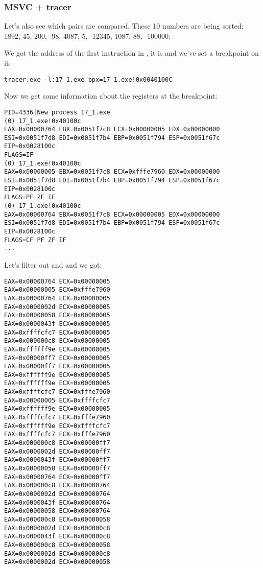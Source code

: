 

\subsubsection{MSVC + tracer}

Let's also see which pairs are compared.
These 10 numbers are being sorted: 
1892, 45, 200, -98, 4087, 5, -12345, 1087, 88, -100000.

We got the address of the first \CMP instruction in \comp, it is  and we've set a breakpoint on it:

\begin{lstlisting}
tracer.exe -l:17_1.exe bpx=17_1.exe!0x0040100C
\end{lstlisting}

Now we get some information about the registers at the breakpoint:

\begin{lstlisting}
PID=4336|New process 17_1.exe
(0) 17_1.exe!0x40100c
EAX=0x00000764 EBX=0x0051f7c8 ECX=0x00000005 EDX=0x00000000
ESI=0x0051f7d8 EDI=0x0051f7b4 EBP=0x0051f794 ESP=0x0051f67c
EIP=0x0028100c
FLAGS=IF
(0) 17_1.exe!0x40100c
EAX=0x00000005 EBX=0x0051f7c8 ECX=0xfffe7960 EDX=0x00000000
ESI=0x0051f7d8 EDI=0x0051f7b4 EBP=0x0051f794 ESP=0x0051f67c
EIP=0x0028100c
FLAGS=PF ZF IF
(0) 17_1.exe!0x40100c
EAX=0x00000764 EBX=0x0051f7c8 ECX=0x00000005 EDX=0x00000000
ESI=0x0051f7d8 EDI=0x0051f7b4 EBP=0x0051f794 ESP=0x0051f67c
EIP=0x0028100c
FLAGS=CF PF ZF IF
...
\end{lstlisting}

Let's filter out  and  and we got:

\begin{lstlisting}
EAX=0x00000764 ECX=0x00000005
EAX=0x00000005 ECX=0xfffe7960
EAX=0x00000764 ECX=0x00000005
EAX=0x0000002d ECX=0x00000005
EAX=0x00000058 ECX=0x00000005
EAX=0x0000043f ECX=0x00000005
EAX=0xffffcfc7 ECX=0x00000005
EAX=0x000000c8 ECX=0x00000005
EAX=0xffffff9e ECX=0x00000005
EAX=0x00000ff7 ECX=0x00000005
EAX=0x00000ff7 ECX=0x00000005
EAX=0xffffff9e ECX=0x00000005
EAX=0xffffff9e ECX=0x00000005
EAX=0xffffcfc7 ECX=0xfffe7960
EAX=0x00000005 ECX=0xffffcfc7
EAX=0xffffff9e ECX=0x00000005
EAX=0xffffcfc7 ECX=0xfffe7960
EAX=0xffffff9e ECX=0xffffcfc7
EAX=0xffffcfc7 ECX=0xfffe7960
EAX=0x000000c8 ECX=0x00000ff7
EAX=0x0000002d ECX=0x00000ff7
EAX=0x0000043f ECX=0x00000ff7
EAX=0x00000058 ECX=0x00000ff7
EAX=0x00000764 ECX=0x00000ff7
EAX=0x000000c8 ECX=0x00000764
EAX=0x0000002d ECX=0x00000764
EAX=0x0000043f ECX=0x00000764
EAX=0x00000058 ECX=0x00000764
EAX=0x000000c8 ECX=0x00000058
EAX=0x0000002d ECX=0x000000c8
EAX=0x0000043f ECX=0x000000c8
EAX=0x000000c8 ECX=0x00000058
EAX=0x0000002d ECX=0x000000c8
EAX=0x0000002d ECX=0x00000058
\end{lstlisting}

